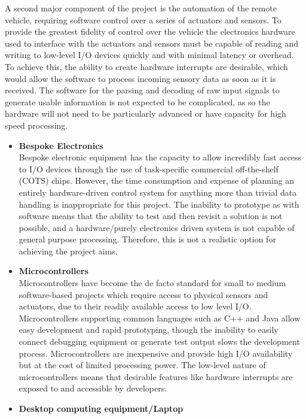 \documentclass[main.tex]{subfiles}
\begin{document}
A second major component of the project is the automation of the remote vehicle, requiring software control over a series of actuators and sensors. To provide the greatest fidelity of control over the vehicle the electronics hardware used to interface with the actuators and sensors must be capable of reading and writing to low-level I/O devices quickly and with minimal latency or overhead. To achieve this, the ability to create hardware interrupts are desirable, which would allow the software to process incoming sensory data as soon as it is received. The software for the parsing and decoding of raw input signals to generate usable information is not expected to be complicated, as so the hardware will not need to be particularly advanced or have capacity for high speed processing.

\begin{itemize}
\item \textbf{Bespoke Electronics}\\
Bespoke electronic equipment has the capacity to allow incredibly fast access to I/O devices through the use of task-specific commercial off-the-shelf (COTS) chips. However, the time consumption and expense of planning an entirely hardware-driven control system for anything more than trivial data handling is inappropriate for this project. The inability to prototype as with software means that the ability to test and then revisit a solution is not possible, and a hardware/purely electronics driven system is not capable of general purpose processing. Therefore, this is not a realistic option for achieving the project aims.
% 
\item \textbf{Microcontrollers}\\
Microcontrollers have become the de facto standard for small to medium software-based projects which require access to physical sensors and actuators, due to their readily available access to low level I/O. Microcontrollers supporting common languages such as C++ and Java allow easy development and rapid prototyping, though the inability to easily connect debugging equipment or generate test output slows the development process. Microcontrollers are inexpensive and provide high I/O availability but at the cost of limited processing power. The low-level nature of microcontrollers means that desirable features like hardware interrupts are exposed to and accessible by developers. 
\item \textbf{Desktop computing equipment/Laptop} \\

\end{itemize}
\end{document}
